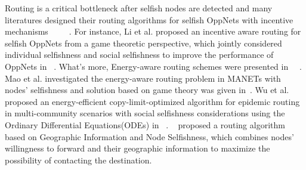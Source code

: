 Routing is a critical bottleneck after selfish nodes are detected and many literatures designed their routing algorithms for selfish OppNets with incentive mechanisms~\cite{DBLP:journals/access/WangWGFL18}~\cite{DBLP:conf/ciss/ChhabraVS17}~\cite{DBLP:conf/wcsp/LiQZC16}~\cite{DBLP:journals/tvt/CaiFW16}~\cite{DBLP:journals/tpds/ChenSY15}. 
For instance, Li et al. proposed an incentive aware routing for selfish OppNets from a game theoretic perspective, which jointly considered individual selfishness and social selfishness to improve the performance of OppNets in ~\cite{DBLP:conf/wcsp/LiQZC16}.
What's more, Energy-aware routing schemes were presented in ~\cite{DBLP:journals/monet/MaoZ15}~\cite{DBLP:conf/globecom/WuZLYP16}. Mao et al. investigated the energy-aware routing problem in MANETs with nodes' selfishness and solution based on game theory was given in~\cite{DBLP:journals/monet/MaoZ15}. Wu et al. proposed an energy-efficient copy-limit-optimized algorithm for epidemic routing in multi-community scenarios with social selfishness considerations using the Ordinary Differential Equations(ODEs) in ~\cite{DBLP:conf/globecom/WuZLYP16}. ~\cite{7914197} proposed a routing algorithm based on Geographic Information and Node Selfishness, which combines nodes' willingness to forward and their geographic information to maximize the possibility of contacting the destination.

